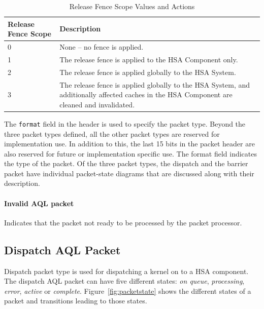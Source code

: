 \begin{table}
  \begin{center}
          \begin{tabular}{|p{1in}|p{5in}|}
      \hline
      \textbf{Release Fence Scope} &\textbf{Description} \\ 
      \hline
      0	& None -- no fence is applied. \\
      \hline
      1	& The release fence is applied to the HSA Component only. \\
      \hline
      2	& The release fence is applied globally to the HSA System.\\
      \hline
      3	& The release fence is applied globally to the HSA System,
      and additionally affected caches in the HSA Component are
      cleaned and invalidated.\\
      \hline
    \end{tabular}
  \end{center}
  \caption{Release Fence Scope Values and Actions}
  \label{releasefencescope}
\end{table}

The \texttt{format} field in the header is used to specify
the packet type. Beyond the three packet types defined, all the
other packet types are reserved for implementation use. In addition
to this, the last 15 bits in the packet header are also reserved for
future or implementation specific use. The format field indicates
the type of the packet. Of the three packet types, the
dispatch and the barrier packet have individual packet-state
diagrams that are discussed along with their description.

\paragraph{Invalid AQL packet} Indicates that the packet not ready
to be processed by the packet processor. 

\hypertarget{dispatch_packet}{}\subsection{Dispatch AQL
Packet}\label{dispatch_packet}

Dispatch packet type is used for dispatching a kernel on to a HSA
component.  The dispatch AQL packet can have five different states:
\emph{on queue}, \emph{processing}, \emph{error}, \emph{active} or
\emph{complete}. Figure~\ref{fig:packetstate} shows the different
states of a packet and transitions leading to those states.

